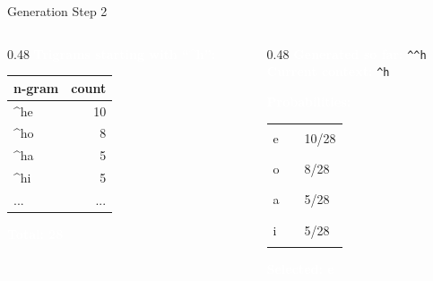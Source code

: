 \documentclass[aspectratio=169]{beamer}
\renewcommand{\textbf}[1]{\textcolor{white}{\bfseries #1}}
\begin{document}
\begin{frame}[c,fragile]{Generation Step 2}
\begin{columns}[c]
\begin{column}{0.48\textwidth}
\textbf{Trigrams starting with ``\textasciicircum h'':}

\vspace{0.5em}
\begin{tabular}{|l|r|}
\hline
\rowcolor{codebg}
n-gram & count \\
\hline
\textasciicircum he & 10 \\
\textasciicircum ho & 8 \\
\textasciicircum ha & 5 \\
\textasciicircum hi & 5 \\
... & ... \\
\hline
\end{tabular}

\vspace{0.5em}
\textbf{Total: 28}
\end{column}

\begin{column}{0.48\textwidth}
\textbf{Generated so far:} \texttt{\textasciicircum\textasciicircum h}\\
\textbf{Current context:} \texttt{\textasciicircum h}

\vspace{0.5em}
\textbf{Probabilities:}

\begin{tabular}{@{}l@{ }l@{ }l@{}}
e & \textcolor{miamired}{\rule{3.0cm}{0.3cm}} & 10/28 \\
o & \textcolor{miamired}{\rule{2.4cm}{0.3cm}} & 8/28 \\
a & \textcolor{miamired}{\rule{1.5cm}{0.3cm}} & 5/28 \\
i & \textcolor{miamired}{\rule{1.5cm}{0.3cm}} & 5/28
\end{tabular}

\vspace{0.5em}
\textbf{Selected: e}
\end{column}
\end{columns}
\end{frame}
\end{document}

